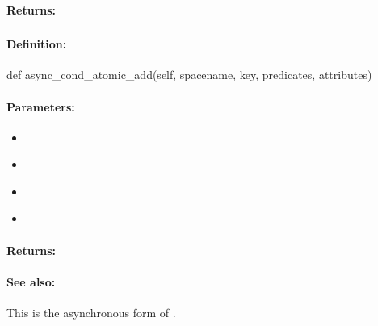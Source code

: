 \paragraph{Returns:}


\pagebreak
\subsubsection{}
\label{api:python:async_cond_atomic_add}


\paragraph{Definition:}
\begin{pythoncode}
def async_cond_atomic_add(self, spacename, key, predicates, attributes)
\end{pythoncode}

\paragraph{Parameters:}
\begin{itemize}[noitemsep]
\item {}\\

\item {}\\

\item {}\\

\item {}\\

\end{itemize}

\paragraph{Returns:}


\paragraph{See also:}  This is the asynchronous form of .

